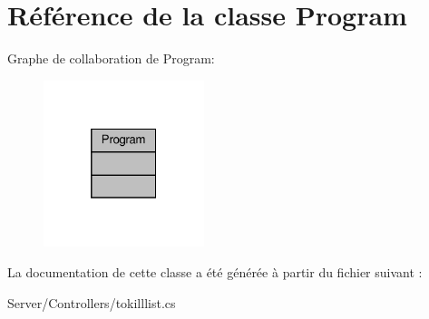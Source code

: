 \hypertarget{class_program}{}\section{Référence de la classe Program}
\label{class_program}


Graphe de collaboration de Program\+:\nopagebreak
\begin{figure}[H]
\begin{center}
\leavevmode
\includegraphics[width=133pt]{class_program__coll__graph}
\end{center}
\end{figure}


La documentation de cette classe a été générée à partir du fichier suivant \+:\begin{DoxyCompactItemize}
\item 
Server/\+Controllers/tokilllist.\+cs\end{DoxyCompactItemize}
